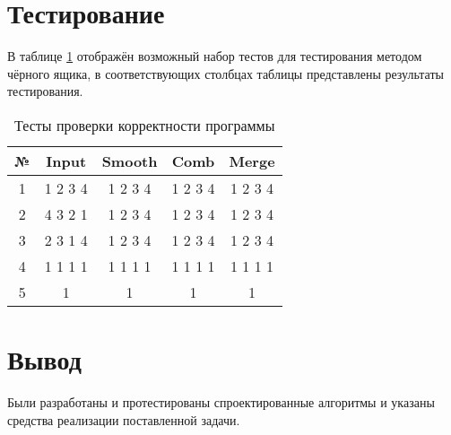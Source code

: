     \section{Тестирование}
        В таблице \ref{table:testing} отображён возможный набор тестов
        для тестирования методом чёрного ящика, в соответствующих столбцах таблицы представлены результаты тестирования.
        \begin{table}[h!]
            \caption{Тесты проверки корректности программы}
            \centering
            \begin{tabular}{|c|c|c|c|c|}
            \hline
            № & Input & Smooth & Comb & Merge \\\hline
            1 & 1 2 3 4 & 1 2 3 4 & 1 2 3 4 & 1 2 3 4 \\ \hline
            2 & 4 3 2 1 & 1 2 3 4 & 1 2 3 4 & 1 2 3 4 \\ \hline
            3 & 2 3 1 4 & 1 2 3 4 & 1 2 3 4 & 1 2 3 4 \\ \hline
            4 & 1 1 1 1 & 1 1 1 1 & 1 1 1 1 & 1 1 1 1 \\ \hline
            5 & 1 & 1 & 1 & 1 \\ \hline
            \end{tabular}
            \label{table:testing}
        \end{table}

	\section*{Вывод}
	
	
	Были разработаны и протестированы спроектированные алгоритмы и указаны средства реализации поставленной задачи.
    	
\newpage